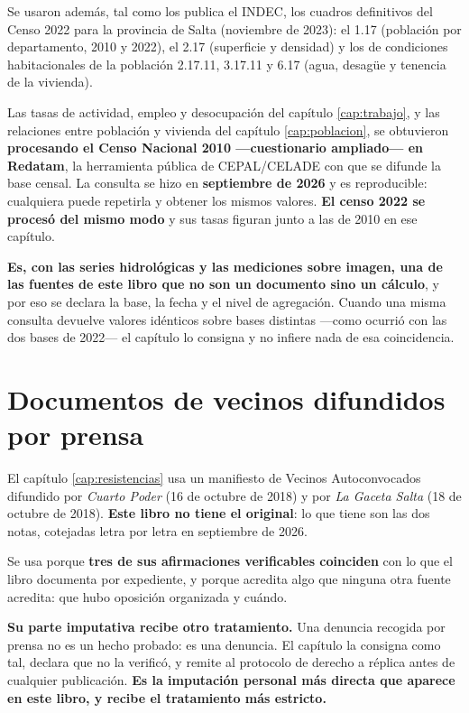 Se usaron además, tal como los publica el INDEC, los cuadros definitivos del Censo 2022 para la provincia de Salta (noviembre de 2023): el 1.17 (población por departamento, 2010 y 2022), el 2.17 (superficie y densidad) y los de condiciones habitacionales de la población 2.17.11, 3.17.11 y 6.17 (agua, desagüe y tenencia de la vivienda).


Las tasas de actividad, empleo y desocupación del capítulo \ref{cap:trabajo}, y las relaciones entre población y vivienda del capítulo \ref{cap:poblacion}, se obtuvieron \textbf{procesando el Censo Nacional 2010 ---cuestionario ampliado--- en Redatam}, la herramienta pública de CEPAL/CELADE con que se difunde la base censal. La consulta se hizo en \textbf{septiembre de 2026} y es reproducible: cualquiera puede repetirla y obtener los mismos valores. \textbf{El censo 2022 se procesó del mismo modo} y sus tasas figuran junto a las de 2010 en ese capítulo.

\textbf{Es, con las series hidrológicas y las mediciones sobre imagen, una de las fuentes de este libro que no son un documento sino un cálculo}, y por eso se declara la base, la fecha y el nivel de agregación. Cuando una misma consulta devuelve valores idénticos sobre bases distintas ---como ocurrió con las dos bases de 2022--- el capítulo lo consigna y no infiere nada de esa coincidencia.

\section{Documentos de vecinos difundidos por prensa}

El capítulo \ref{cap:resistencias} usa un manifiesto de Vecinos Autoconvocados difundido por \textit{Cuarto Poder} (16 de octubre de 2018) y por \textit{La Gaceta Salta} (18 de octubre de 2018). \textbf{Este libro no tiene el original}: lo que tiene son las dos notas, cotejadas letra por letra en septiembre de 2026.

Se usa porque \textbf{tres de sus afirmaciones verificables coinciden} con lo que el libro documenta por expediente, y porque acredita algo que ninguna otra fuente acredita: que hubo oposición organizada y cuándo.

\textbf{Su parte imputativa recibe otro tratamiento.} Una denuncia recogida por prensa no es un hecho probado: es una denuncia. El capítulo la consigna como tal, declara que no la verificó, y remite al protocolo de derecho a réplica antes de cualquier publicación. \textbf{Es la imputación personal más directa que aparece en este libro, y recibe el tratamiento más estricto.}

